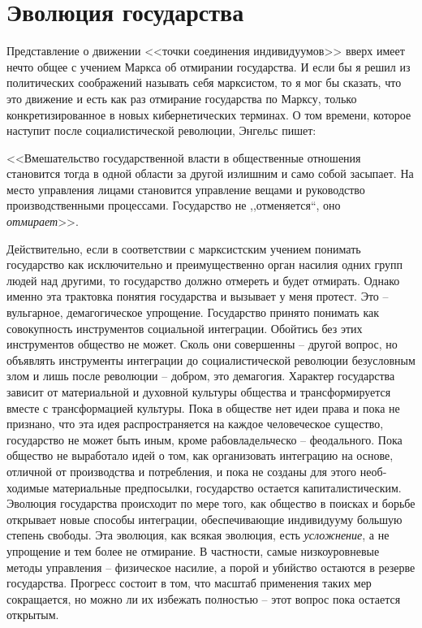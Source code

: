 \documentclass{book}
\begin{document}
\section{Эволюция государства}

Представление о движении <<точки соединения индивиду­умов>> вверх имеет нечто общее с учением Маркса об отмира­нии государства. И если бы я решил из политических сообра­жений называть себя марксистом, то я мог бы сказать, что это движение и есть как раз отмирание государства по Марксу, только конкретизированное в новых кибернетических терми­нах. О том времени, которое наступит после социалистической революции, Энгельс пишет:

<<Вмешательство государственной власти в общественные отношения становится тогда в одной области за другой излиш­ним и само собой засыпает. На место управления лицами стано­вится управление вещами и руководство производственными процессами. Государство не ,,отменяется``, оно \textit{отмирает}>>. 

Действительно, если в соответствии с марксистским учением понимать государство как исключительно и преимущественно орган насилия одних групп людей над другими, то государство должно отмереть и будет отмирать. Однако именно эта трак­товка понятия государства и вызывает у меня протест. Это -- вульгарное, демагогическое упрощение. Государство принято понимать как совокупность инструментов социальной интег­рации. Обойтись без этих инструментов общество не может. Сколь они совершенны -- другой вопрос, но объявлять инстру­менты интеграции до социалистической революции безуслов­ным злом и лишь после революции -- добром, это демагогия.
Характер государства зависит от материальной и духовной культуры общества и трансформируется вместе с трансфор­мацией культуры. Пока в обществе нет идеи права и пока не признано, что эта идея распространяется на каждое человече­ское существо, государство не может быть иным, кроме рабовладельческо -- феодального. Пока общество не выработало идей о том, как организовать интеграцию на основе, отличной от производства и потребления, и пока не созданы для этого необ­ходимые материальные предпосылки, государство остается капиталистическим. Эволюция государства происходит по ме­ре того, как общество в поисках и борьбе открывает новые способы интеграции, обеспечивающие индивидууму большую степень свободы. Эта эволюция, как всякая эволюция, есть \textit{усложнение},  а не упрощение и тем более не отмирание. В част­ности, самые низкоуровневые методы управления -- физическое насилие, а порой и убийство остаются в резерве государства. Прогресс состоит в том, что масштаб применения таких мер сокращается, но можно ли их 
избежать 
полностью -- этот вопрос пока остается открытым.
\end{document}
